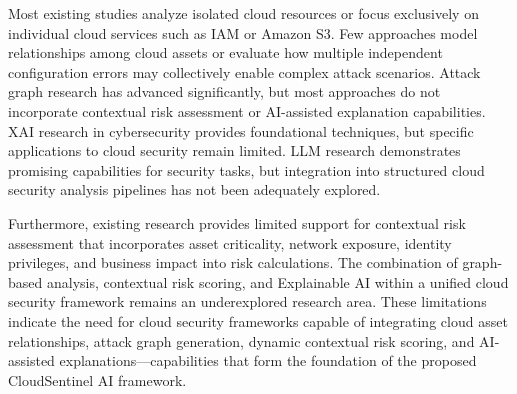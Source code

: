 Most existing studies analyze isolated cloud resources or focus exclusively on individual cloud services such as IAM or Amazon S3. Few approaches model relationships among cloud assets or evaluate how multiple independent configuration errors may collectively enable complex attack scenarios. Attack graph research has advanced significantly, but most approaches do not incorporate contextual risk assessment or AI-assisted explanation capabilities. XAI research in cybersecurity provides foundational techniques, but specific applications to cloud security remain limited. LLM research demonstrates promising capabilities for security tasks, but integration into structured cloud security analysis pipelines has not been adequately explored.

Furthermore, existing research provides limited support for contextual risk assessment that incorporates asset criticality, network exposure, identity privileges, and business impact into risk calculations. The combination of graph-based analysis, contextual risk scoring, and Explainable AI within a unified cloud security framework remains an underexplored research area. These limitations indicate the need for cloud security frameworks capable of integrating cloud asset relationships, attack graph generation, dynamic contextual risk scoring, and AI-assisted explanations---capabilities that form the foundation of the proposed CloudSentinel AI framework.
